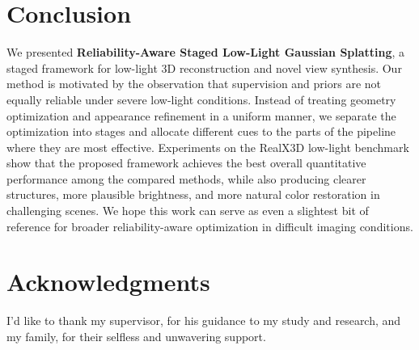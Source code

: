 \section{Conclusion}
\label{sec:conclusion}

We presented \textbf{Reliability-Aware Staged Low-Light Gaussian Splatting},
a staged framework for low-light 3D reconstruction and novel view
synthesis. Our method is motivated by the observation that supervision
and priors are not equally reliable under severe low-light conditions.
Instead of treating geometry optimization and appearance refinement in a uniform manner,
we separate the optimization into stages and allocate different
cues to the parts of the pipeline where they are most effective.
Experiments on the RealX3D low-light benchmark show that the
proposed framework achieves the best overall quantitative performance
among the compared methods, while also producing clearer structures,
more plausible brightness, and more natural color restoration
in challenging scenes. We hope this work can serve as even a
slightest bit of reference for broader reliability-aware optimization
in difficult imaging conditions.

\section*{Acknowledgments}
I'd like to thank my supervisor, for his guidance to my study and research, and my family, for their selfless and unwavering support.
